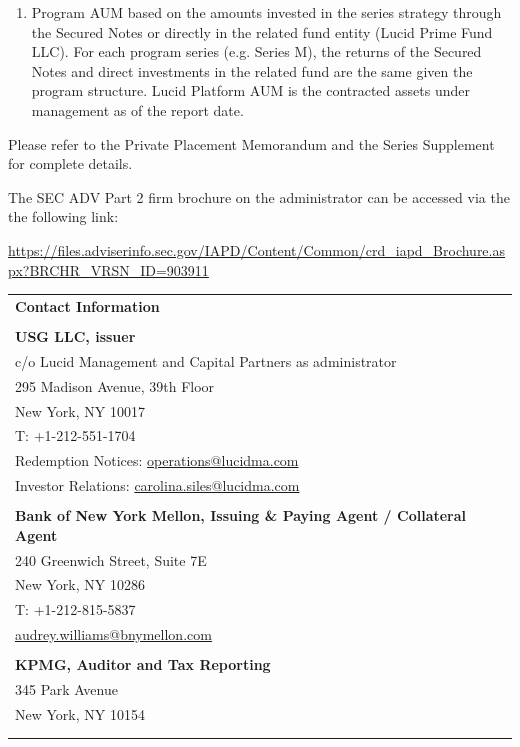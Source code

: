 \documentclass[9pt]{article}
\begin{document}
\begin{enumerate}
\item Program AUM based on the amounts invested in the series strategy through the Secured Notes or directly in the related fund entity (Lucid Prime Fund LLC).  For each program series (e.g. Series M), the returns of the Secured Notes and direct investments in the related fund are the same given the program structure. Lucid Platform AUM is the contracted assets under management as of the report date.

\end{enumerate}

\noindent Please refer to the Private Placement Memorandum and the Series Supplement for complete details. 

{\color{gray} \noindent The SEC ADV Part 2 firm brochure on the administrator can be accessed via the the following link:

\noindent\underline{https://files.adviserinfo.sec.gov/IAPD/Content/Common/crd\_iapd\_Brochure.aspx?BRCHR\_VRSN\_ID=903911}}

\begin{center}\noindent\begin{tabular}{p{\textwidth}}
\rowcolor{lucid_blue} 
{\color[HTML]{FFFFFF} \textbf{Contact Information}} \\
\rowcolor[HTML]{EFEFEF} 
 \\
\rowcolor[HTML]{EFEFEF} 
\textbf{USG LLC, issuer} \\
\rowcolor[HTML]{EFEFEF} 
 c/o Lucid Management and Capital Partners as administrator\\
\rowcolor[HTML]{EFEFEF} 
 295 Madison Avenue, 39th Floor\\
\rowcolor[HTML]{EFEFEF} 
 New York, NY 10017\\
\rowcolor[HTML]{EFEFEF} 
 T: +1-212-551-1704\\
\rowcolor[HTML]{EFEFEF} 
 Redemption Notices: \underline{operations@lucidma.com}\\
\rowcolor[HTML]{EFEFEF} 
 Investor Relations: \underline{carolina.siles@lucidma.com}\\
\rowcolor[HTML]{EFEFEF} 
 \\
\rowcolor[HTML]{EFEFEF} 
\textbf{Bank of New York Mellon, Issuing \& Paying Agent / Collateral Agent} \\
\rowcolor[HTML]{EFEFEF} 
 240 Greenwich Street, Suite 7E\\
\rowcolor[HTML]{EFEFEF} 
 New York, NY 10286\\
\rowcolor[HTML]{EFEFEF} 
 T: +1-212-815-5837\\
\rowcolor[HTML]{EFEFEF} 
 \underline{audrey.williams@bnymellon.com}\\
\rowcolor[HTML]{EFEFEF} 
 \\
\rowcolor[HTML]{EFEFEF} 
 \textbf{KPMG, Auditor and Tax Reporting}\\
\rowcolor[HTML]{EFEFEF} 
 345 Park Avenue\\
\rowcolor[HTML]{EFEFEF} 
 New York, NY 10154\\
\rowcolor[HTML]{EFEFEF} 
 \\
\rowcolor[HTML]{EFEFEF} 

\end{tabular}
\end{center}
\end{document}
